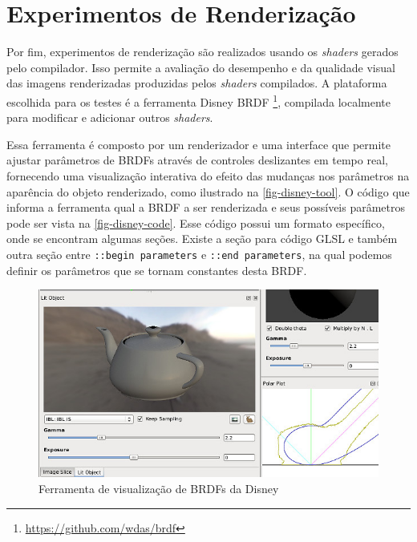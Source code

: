 \documentclass[english, 
               brazil, 
               bsc] %
               {dcomp-abntex2}
\begin{document}
\section{Experimentos de Renderização} \label{experimentos-renderizacao}




Por fim, experimentos de renderização são realizados usando os \textit{shaders} gerados pelo compilador. Isso permite a avaliação do desempenho e da qualidade visual das imagens renderizadas produzidas pelos \textit{shaders} compilados. A plataforma escolhida para os testes é a ferramenta Disney BRDF \footnote{\url{https://github.com/wdas/brdf}}, compilada localmente para modificar e adicionar outros \textit{shaders}.


Essa ferramenta é composto por um renderizador e uma interface que permite ajustar parâmetros de BRDFs através de controles deslizantes em tempo real, fornecendo uma visualização interativa do efeito das mudanças nos parâmetros na aparência do objeto renderizado, como ilustrado na \autoref{fig-disney-tool}. O código que informa a ferramenta qual a BRDF a ser renderizada e seus possíveis parâmetros pode ser vista na \autoref{fig-disney-code}. Esse código possui um formato específico, onde se encontram algumas seções. Existe a seção para código GLSL e também outra seção entre \texttt{::begin parameters} e \texttt{::end parameters}, na qual podemos definir os parâmetros que se tornam constantes desta BRDF.




\begin{figure}[htb]
        \caption{\label{fig-disney-tool} \small Ferramenta de visualização de BRDFs da Disney}
        \begin{center}
            \includegraphics[scale=0.7]{./Imagens/disney-brdf-tool.png}
        \end{center}
\end{figure}
\end{document}
